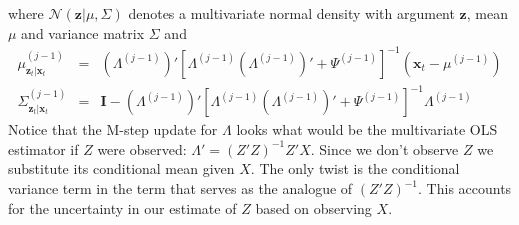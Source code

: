 \documentclass[12pt]{article}
\theoremstyle{definition}
\begin{document}
where $\mathcal{N}(\mathbf{z}|\mu, \Sigma)$ denotes a multivariate normal density with argument $\mathbf{z}$, mean $\mu$ and variance matrix $\Sigma$ and
	\begin{eqnarray*}
		\mu^{(j-1)}_{\mathbf{z}_t|\mathbf{x}_t} &=& \left(\Lambda^{(j-1)}\right)' \left[\Lambda^{(j-1)} \left(\Lambda^{(j-1)}\right)' + \Psi^{(j-1)}\right]^{-1} \left(\mathbf{x}_t - \mu^{(j-1)}\right) \\
		\Sigma^{(j-1)}_{\mathbf{z}_t|\mathbf{x}_t}  &=& \mathbf{I} - \left(\Lambda^{(j-1)}\right)' \left[\Lambda^{(j-1)} \left(\Lambda^{(j-1)}\right)' + \Psi^{(j-1)}\right]^{-1}\Lambda^{(j-1)}
	\end{eqnarray*}
Notice that the M-step update for $\Lambda$ looks what would be the multivariate OLS estimator if $Z$ were observed: $\Lambda' = (Z'Z)^{-1}Z'X$. Since we don't observe $Z$ we substitute its conditional mean given $X$. The only twist is the conditional variance term in the term that serves as the analogue of $(Z'Z)^{-1}$. This accounts for the uncertainty in our estimate of $Z$ based on observing $X$.
\end{document}
